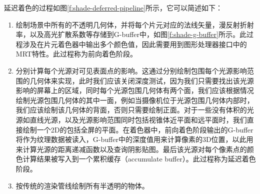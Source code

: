 延迟着色的过程如图\ref{f:shade-deferred-pipeline}所示，它可以简述如下：

\begin{enumerate}
	\item 绘制场景中所有的不透明几何体，并将每个片元对应的法线矢量，漫反射折射率，以及高光扩散系数等存储到G-buffer中，如图\ref{f:shade-g-buffer}所示。此过程涉及在片元着色器中输出多个颜色值，因此需要用到图形处理器接口中的MRT特性。此过程称为前向着色阶段。
	\item 分别计算每个光源对可见表面点的影响。这通过分别绘制包围每个光源影响范围的几何体来实现，此时我们应该关闭深度测试，因为我们只需要找出该光源影响的屏幕上的区域，同时每个光源包围几何体有两个面，我们应该根据情况绘制光源包围几何体的其中一面，例如当摄像机位于光源包围几何体内部时，我们应该绘制该几何体的背面，否则只需要绘制正面。对于一些没有体积的光源如直线光源，以及光源影响范围同时包括视锥体近平面和远平面时，我们直接绘制一个2D的包括全屏的平面。在着色器中，前向着色阶段输出的G-buffer将作为纹理数据被读入，G-buffer中的深度值用来计算像素的3D位置，以此用来计算光源的距离递减函数以及查询阴影贴图。最后该光源对每个像素点的颜色计算结果被写入到一个累积缓存（accumulate buffer）。此过程称为延迟着色阶段。
	\item 按传统的渲染管线绘制所有半透明的物体。
\end{enumerate}

